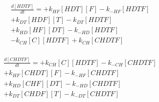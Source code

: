 \begin{equation}
\begin{split}
\frac{d[HDTF]}{dt} =  + k_{HF}[HDT][F]  - k_{-HF}[HDTF]     \\%
                      + k_{DT}[HDF][T]  - k_{DT}[HDTF]     \\%
                      + k_{HD}[HF][DT]  - k_{-HD}[HDTF]     \\%
                      - k_{CH}[C][HDTF]   + k_{CH}[CHDTF]    \\%
\end{split}
\end{equation}

\begin{equation}
\begin{split}
\frac{d[CHDTF]}{dt} = + k_{CH}[C][HDTF]  - k_{-CH}[CHDTF]     \\%
                      + k_{HF}[CHDT][F]  - k_{-HF}[CHDTF]     \\%
                      + k_{HD}[CHF][DT]  - k_{-HD}[CHDTF]     \\%
                      + k_{DT}[CHDF][T]  - k_{-DT}[CHDTF]     \\%
\end{split}
\end{equation}